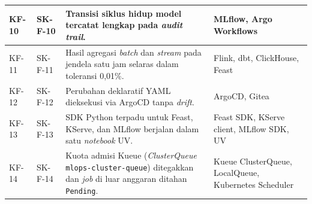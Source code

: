 {\begin{longtable}{|>{\centering\arraybackslash}m{1.3cm}|>{\centering\arraybackslash}m{1.3cm}|m{6.5cm}|m{4.5cm}|}
\hline
KF-10 & SK-F-10 & Transisi siklus hidup model tercatat lengkap pada \textit{audit trail}. & MLflow, Argo Workflows \\
\hline
KF-11 & SK-F-11 & Hasil agregasi \textit{batch} dan \textit{stream} pada jendela satu jam selaras dalam toleransi 0,01\%. & Flink, dbt, ClickHouse, Feast \\
\hline
KF-12 & SK-F-12 & Perubahan deklaratif YAML dieksekusi via ArgoCD tanpa \textit{drift}. & ArgoCD, Gitea \\
\hline
KF-13 & SK-F-13 & SDK Python terpadu untuk Feast, KServe, dan MLflow berjalan dalam satu \textit{notebook} UV. & Feast SDK, KServe client, MLflow SDK, UV \\
\hline
KF-14 & SK-F-14 & Kuota admisi Kueue (\textit{ClusterQueue} \texttt{mlops-cluster-queue}) ditegakkan dan \textit{job} di luar anggaran ditahan \texttt{Pending}. & Kueue ClusterQueue, LocalQueue, Kubernetes Scheduler \\
\hline
\end{longtable}
}
